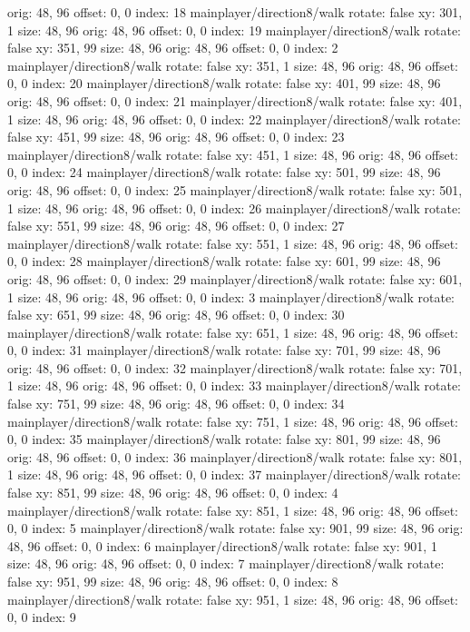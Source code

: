   orig: 48, 96
  offset: 0, 0
  index: 18
mainplayer/direction8/walk
  rotate: false
  xy: 301, 1
  size: 48, 96
  orig: 48, 96
  offset: 0, 0
  index: 19
mainplayer/direction8/walk
  rotate: false
  xy: 351, 99
  size: 48, 96
  orig: 48, 96
  offset: 0, 0
  index: 2
mainplayer/direction8/walk
  rotate: false
  xy: 351, 1
  size: 48, 96
  orig: 48, 96
  offset: 0, 0
  index: 20
mainplayer/direction8/walk
  rotate: false
  xy: 401, 99
  size: 48, 96
  orig: 48, 96
  offset: 0, 0
  index: 21
mainplayer/direction8/walk
  rotate: false
  xy: 401, 1
  size: 48, 96
  orig: 48, 96
  offset: 0, 0
  index: 22
mainplayer/direction8/walk
  rotate: false
  xy: 451, 99
  size: 48, 96
  orig: 48, 96
  offset: 0, 0
  index: 23
mainplayer/direction8/walk
  rotate: false
  xy: 451, 1
  size: 48, 96
  orig: 48, 96
  offset: 0, 0
  index: 24
mainplayer/direction8/walk
  rotate: false
  xy: 501, 99
  size: 48, 96
  orig: 48, 96
  offset: 0, 0
  index: 25
mainplayer/direction8/walk
  rotate: false
  xy: 501, 1
  size: 48, 96
  orig: 48, 96
  offset: 0, 0
  index: 26
mainplayer/direction8/walk
  rotate: false
  xy: 551, 99
  size: 48, 96
  orig: 48, 96
  offset: 0, 0
  index: 27
mainplayer/direction8/walk
  rotate: false
  xy: 551, 1
  size: 48, 96
  orig: 48, 96
  offset: 0, 0
  index: 28
mainplayer/direction8/walk
  rotate: false
  xy: 601, 99
  size: 48, 96
  orig: 48, 96
  offset: 0, 0
  index: 29
mainplayer/direction8/walk
  rotate: false
  xy: 601, 1
  size: 48, 96
  orig: 48, 96
  offset: 0, 0
  index: 3
mainplayer/direction8/walk
  rotate: false
  xy: 651, 99
  size: 48, 96
  orig: 48, 96
  offset: 0, 0
  index: 30
mainplayer/direction8/walk
  rotate: false
  xy: 651, 1
  size: 48, 96
  orig: 48, 96
  offset: 0, 0
  index: 31
mainplayer/direction8/walk
  rotate: false
  xy: 701, 99
  size: 48, 96
  orig: 48, 96
  offset: 0, 0
  index: 32
mainplayer/direction8/walk
  rotate: false
  xy: 701, 1
  size: 48, 96
  orig: 48, 96
  offset: 0, 0
  index: 33
mainplayer/direction8/walk
  rotate: false
  xy: 751, 99
  size: 48, 96
  orig: 48, 96
  offset: 0, 0
  index: 34
mainplayer/direction8/walk
  rotate: false
  xy: 751, 1
  size: 48, 96
  orig: 48, 96
  offset: 0, 0
  index: 35
mainplayer/direction8/walk
  rotate: false
  xy: 801, 99
  size: 48, 96
  orig: 48, 96
  offset: 0, 0
  index: 36
mainplayer/direction8/walk
  rotate: false
  xy: 801, 1
  size: 48, 96
  orig: 48, 96
  offset: 0, 0
  index: 37
mainplayer/direction8/walk
  rotate: false
  xy: 851, 99
  size: 48, 96
  orig: 48, 96
  offset: 0, 0
  index: 4
mainplayer/direction8/walk
  rotate: false
  xy: 851, 1
  size: 48, 96
  orig: 48, 96
  offset: 0, 0
  index: 5
mainplayer/direction8/walk
  rotate: false
  xy: 901, 99
  size: 48, 96
  orig: 48, 96
  offset: 0, 0
  index: 6
mainplayer/direction8/walk
  rotate: false
  xy: 901, 1
  size: 48, 96
  orig: 48, 96
  offset: 0, 0
  index: 7
mainplayer/direction8/walk
  rotate: false
  xy: 951, 99
  size: 48, 96
  orig: 48, 96
  offset: 0, 0
  index: 8
mainplayer/direction8/walk
  rotate: false
  xy: 951, 1
  size: 48, 96
  orig: 48, 96
  offset: 0, 0
  index: 9

